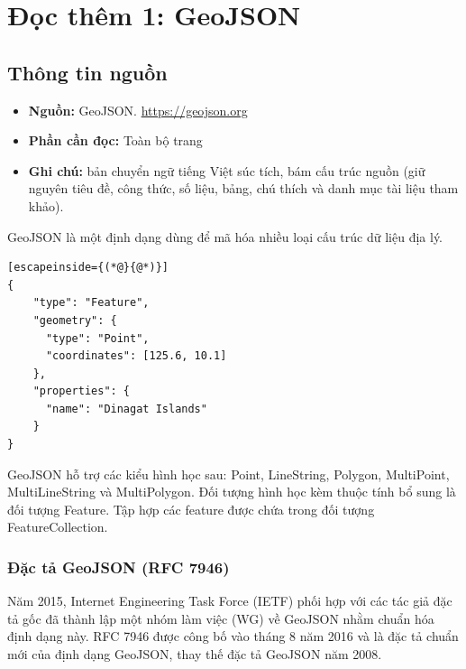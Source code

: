 \chapter{Đọc thêm 1: GeoJSON}
\label{ch:M6L1DocThem1}

\section{Thông tin nguồn}

\begin{itemize}
  \item \textbf{Nguồn:} GeoJSON. \url{https://geojson.org}
  \item \textbf{Phần cần đọc:} Toàn bộ trang
  \item \textbf{Ghi chú:} bản chuyển ngữ tiếng Việt súc tích, bám cấu trúc nguồn (giữ nguyên tiêu đề, công thức, số liệu, bảng, chú thích và danh mục tài liệu tham khảo).
\end{itemize}

GeoJSON là một định dạng dùng để mã hóa nhiều loại cấu trúc dữ liệu địa lý.

\begin{lstlisting}[escapeinside={(*@}{@*)}]
{
    "type": "Feature",
    "geometry": {
      "type": "Point",
      "coordinates": [125.6, 10.1]
    },
    "properties": {
      "name": "Dinagat Islands"
    }
}
\end{lstlisting}

GeoJSON hỗ trợ các kiểu hình học sau: Point, LineString, Polygon, MultiPoint, MultiLineString và MultiPolygon. Đối tượng hình học kèm thuộc tính bổ sung là đối tượng Feature. Tập hợp các feature được chứa trong đối tượng FeatureCollection.

\subsection{Đặc tả GeoJSON (RFC 7946)}

Năm 2015, Internet Engineering Task Force (IETF) phối hợp với các tác giả đặc tả gốc đã thành lập một nhóm làm việc (WG) về GeoJSON nhằm chuẩn hóa định dạng này. RFC 7946 được công bố vào tháng 8 năm 2016 và là đặc tả chuẩn mới của định dạng GeoJSON, thay thế đặc tả GeoJSON năm 2008.
